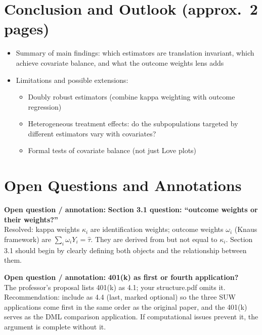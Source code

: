 \documentclass[12pt, a4paper]{article}
\newenvironment{openbox}{%
  \begin{mdframed}[backgroundcolor=greenbg,linecolor=notegreen,linewidth=1pt]%
  \textbf{\color{notegreen}Open question / annotation:} }{%
  \end{mdframed}}
\begin{document}
\section{Conclusion and Outlook \textnormal{\small(approx.\ 2 pages)}}

\begin{itemize}
  \item Summary of main findings: which estimators are translation invariant, which achieve covariate balance, and what the outcome weights lens adds
  \item Limitations and possible extensions:
    \begin{itemize}
      \item Doubly robust estimators (combine kappa weighting with outcome regression)
      \item Heterogeneous treatment effects: do the subpopulations targeted by different estimators vary with covariates?
      \item Formal tests of covariate balance (not just Love plots)
    \end{itemize}
\end{itemize}

\section*{Open Questions and Annotations}

\begin{openbox}
\textbf{Section 3.1 question: ``outcome weights or their weights?''}\\
Resolved: kappa weights $\kappa_i$ are identification weights; outcome weights $\omega_i$ (Knaus framework) are $\sum_i \omega_i Y_i = \hat\tau$. They are derived from but not equal to $\kappa_i$. Section 3.1 should begin by clearly defining both objects and the relationship between them.
\end{openbox}

\begin{openbox}
\textbf{401(k) as first or fourth application?}\\
The professor's proposal lists 401(k) as 4.1; your structure.pdf omits it. Recommendation: include as 4.4 (last, marked optional) so the three SUW applications come first in the same order as the original paper, and the 401(k) serves as the DML comparison application. If computational issues prevent it, the argument is complete without it.
\end{openbox}
\end{document}
